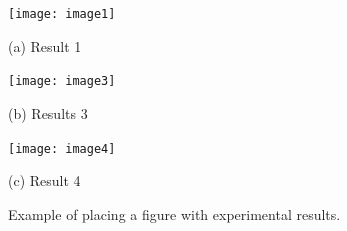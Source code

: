 \documentclass{article}
\begin{document}
\begin{figure}[htb]

\begin{minipage}[b]{1.0\linewidth}
  \centering
  \centerline{\texttt{[image: image1]}}
  \centerline{(a) Result 1}\medskip
\end{minipage}
%
\begin{minipage}[b]{.48\linewidth}
  \centering
  \centerline{\texttt{[image: image3]}}
  \centerline{(b) Results 3}\medskip
\end{minipage}
\hfill
\begin{minipage}[b]{0.48\linewidth}
  \centering
  \centerline{\texttt{[image: image4]}}
  \centerline{(c) Result 4}\medskip
\end{minipage}
%
\caption{Example of placing a figure with experimental results.}
\label{fig:res}
%
\end{figure}




\vfill\pagebreak



\end{document}

